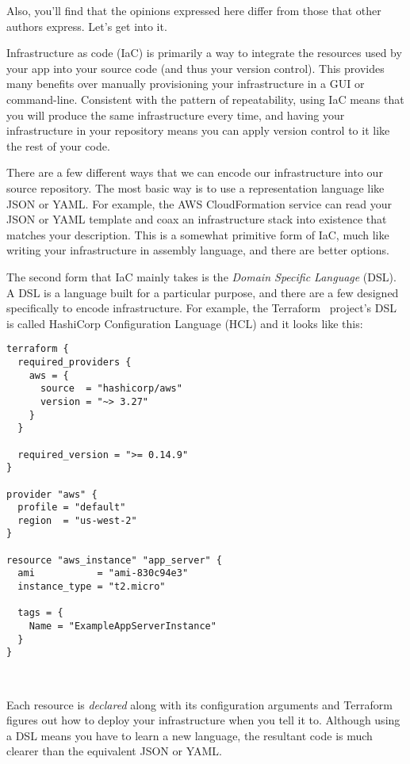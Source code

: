 \documentclass{article}
\newcommand{\noterm}[1]{\textit{#1}}
\newcommand{\term}[1]{\noterm{#1}\index{#1}}
\begin{document}
Also, you'll find that the opinions expressed here differ from those that other authors express. Let's get into it.

Infrastructure as code (IaC) is primarily a way to integrate the resources used by your app into your source code (and thus your version control).
This provides many benefits over manually provisioning your infrastructure in a GUI or command-line.
Consistent with the pattern of repeatability, using IaC means that you will produce the same infrastructure every time, and having your infrastructure in your repository means you can apply version control to it like the rest of your code.

There are a few different ways that we can encode our infrastructure into our source repository.
The most basic way is to use a representation language like JSON or YAML.
For example, the AWS CloudFormation service can read your JSON or YAML template and coax an infrastructure stack into existence that matches your description.
This is a somewhat primitive form of IaC, much like writing your infrastructure in assembly language, and there are better options.

The second form that IaC mainly takes is the \term{Domain Specific Language} (DSL).
A DSL is a language built for a particular purpose, and there are a few designed specifically to encode infrastructure.
For example, the Terraform~\cite{terraform} project's DSL is called HashiCorp Configuration Language (HCL) and it looks like this:

\begin{verbatim}
terraform {
  required_providers {
    aws = {
      source  = "hashicorp/aws"
      version = "~> 3.27"
    }
  }

  required_version = ">= 0.14.9"
}

provider "aws" {
  profile = "default"
  region  = "us-west-2"
}

resource "aws_instance" "app_server" {
  ami           = "ami-830c94e3"
  instance_type = "t2.micro"

  tags = {
    Name = "ExampleAppServerInstance"
  }
}
\end{verbatim}~\cite{terraform-example}

Each resource is \textit{declared} along with its configuration arguments and Terraform figures out how to deploy your infrastructure when you tell it to.
Although using a DSL means you have to learn a new language, the resultant code is much clearer than the equivalent JSON or YAML.
\end{document}
